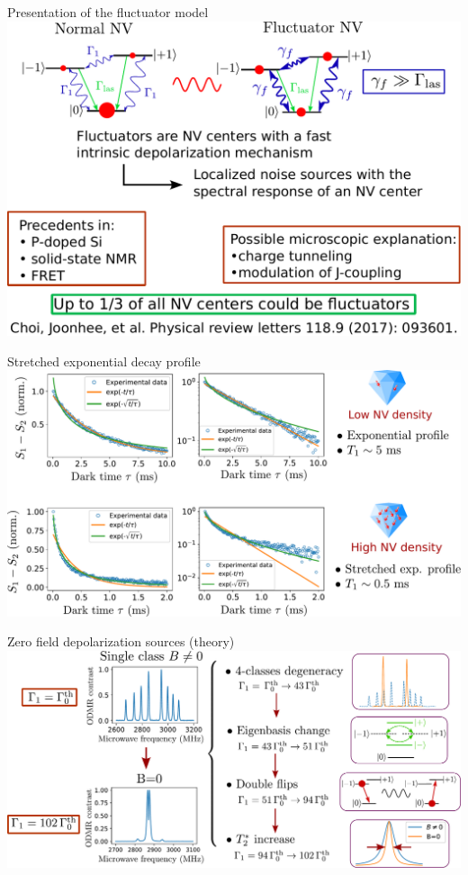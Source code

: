 \documentclass{beamer}
\begin{document}
\begin{frame}{Presentation of the fluctuator model}
\centering
\includegraphics[width=\textwidth,height=0.8\textheight,keepaspectratio]{Slide_fluct_intro}
\end{frame}

\begin{frame}{Stretched exponential decay profile}
\centering
\includegraphics[width=\textwidth,height=0.9\textheight,keepaspectratio]{Slide_T1_exp_stretch}
\end{frame}

\begin{frame}{Zero field depolarization sources (theory)}
\centering
\includegraphics[width=\textwidth,height=0.9\textheight,keepaspectratio]{Slide_0B_theorie}
\end{frame}
\end{document}
